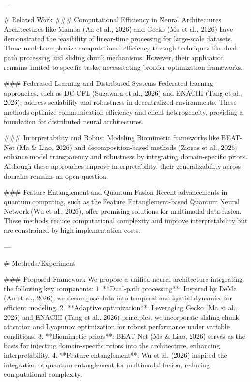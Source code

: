 ---

# Related Work  
### Computational Efficiency in Neural Architectures  
Architectures like Mamba (An et al., 2026) and Gecko (Ma et al., 2026) have demonstrated the feasibility of linear-time processing for large-scale datasets. These models emphasize computational efficiency through techniques like dual-path processing and sliding chunk mechanisms. However, their application remains limited to specific tasks, necessitating broader optimization frameworks.

### Federated Learning and Distributed Systems  
Federated learning approaches, such as DC-CFL (Sugawara et al., 2026) and ENACHI (Tang et al., 2026), address scalability and robustness in decentralized environments. These methods optimize communication efficiency and client heterogeneity, providing a foundation for distributed neural architectures.

### Interpretability and Robust Modeling  
Biomimetic frameworks like BEAT-Net (Ma & Liao, 2026) and decomposition-based methods (Ziogas et al., 2026) enhance model transparency and robustness by integrating domain-specific priors. Although these approaches improve interpretability, their generalizability across domains remains an open question.

### Feature Entanglement and Quantum Fusion  
Recent advancements in quantum computing, such as the Feature Entanglement-based Quantum Neural Network (Wu et al., 2026), offer promising solutions for multimodal data fusion. These methods reduce computational complexity and improve interpretability but are constrained by high implementation costs.

---

# Methods/Experiment  

### Proposed Framework  
We propose a unified neural architecture integrating the following key components:  
1. **Dual-path processing**: Inspired by DeMa (An et al., 2026), we decompose data into temporal and spatial dynamics for efficient modeling.  
2. **Adaptive optimization**: Leveraging Gecko (Ma et al., 2026) and ENACHI (Tang et al., 2026) principles, we incorporate sliding chunk attention and Lyapunov optimization for robust performance under variable conditions.  
3. **Biomimetic priors**: BEAT-Net (Ma & Liao, 2026) serves as the basis for injecting domain-specific priors into the architecture, enhancing interpretability.  
4. **Feature entanglement**: Wu et al. (2026) inspired the integration of quantum entanglement for multimodal fusion, reducing computational complexity.

